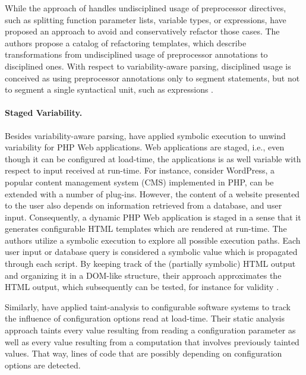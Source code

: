 While the approach of \cite{kastner_variability-aware_2011} handles
undisciplined usage of preprocessor directives, such as splitting function parameter lists, variable types, or
expressions, \cite{medeiros_discipline_2017} have proposed an approach to avoid and
conservatively refactor those cases. The authors propose a catalog of
refactoring templates, which describe transformations from undisciplined usage
of preprocessor annotations to disciplined ones. With respect to
variability-aware parsing, disciplined usage is conceived as using preprocessor
annotations only to segment statements, but not to segment a single syntactical
unit, such as expressions \citep{medeiros_discipline_2017}.

\paragraph{Staged Variability.} Besides variability-aware parsing,
\cite{nguyen_building_2014} have applied symbolic execution
\citep{king_symbolic_1976,darringer_applications_1978} to unwind variability for
PHP Web applications. Web applications are staged, i.e., even though it can be configured at load-time, the applications is as well variable with respect to input received at run-time. For instance,
consider WordPress, a popular content management system (CMS) implemented in
PHP, can be extended with a number of plug-ins. However, the content of a
website presented to the user also depends on information retrieved from a
database, and user input. Consequently, a dynamic PHP Web application is staged
in a sense that it generates configurable HTML templates which are rendered at
run-time. The authors utilize a symbolic execution to explore all possible
execution paths. Each user input or database query is considered a symbolic
value which is propagated through each script. By keeping track of the
(partially symbolic) HTML output and organizing it in a DOM-like structure,
their approach approximates the HTML output, which subsequently can be tested,
for instance for validity \citep{nguyen_auto-locating_2011}.

Similarly, \cite{lillack_tracking_2014} have applied taint-analysis to configurable software
systems to track the influence of configuration options read at load-time.
Their static analysis approach taints every value resulting from reading a
configuration parameter as well as every value resulting from a computation
that involves previously tainted values. That way, lines of code that are
possibly depending on configuration options are detected.

